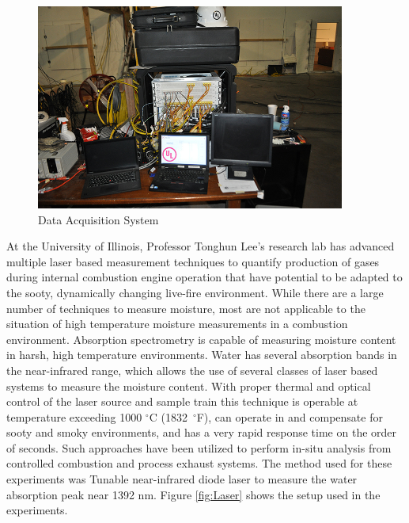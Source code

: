 \documentclass[12pt,oneside]{book}
\begin{document}
\begin{figure}[H]
	\centering
	\includegraphics[width = 4in]{../0_Images/Instrumentation/DataSystem}
	\caption{Data Acquisition System}
	\label{fig:DataSystem}
\end{figure}

At the University of Illinois, Professor Tonghun Lee's research lab has advanced multiple laser based measurement techniques to quantify production of gases during internal combustion engine operation that have potential to be adapted to the sooty, dynamically changing live-fire environment. While there are a large number of techniques to measure moisture, most are not applicable to the situation of high temperature moisture measurements in a combustion environment.  Absorption spectrometry is capable of measuring moisture content in harsh, high temperature environments.  Water has several absorption bands in the near-infrared range, which allows the use of several classes of laser based systems to measure the moisture content.  With proper thermal and optical control of the laser source and sample train this technique is operable at temperature exceeding 1000 $^\circ$C (1832~$^\circ$F), can operate in and compensate for sooty and smoky environments, and has a very rapid response time on the order of seconds.  Such approaches have been utilized to perform in-situ analysis from controlled combustion and process exhaust systems.  The method used for these experiments was Tunable near-infrared diode laser to measure the water absorption peak near 1392 nm. Figure \ref{fig:Laser} shows the setup used in the experiments.
\end{document}
